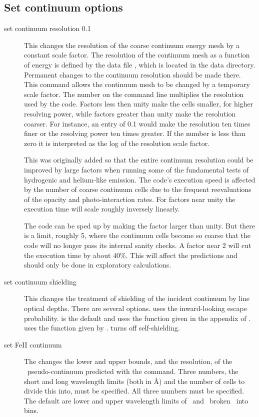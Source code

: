 \subsection{Set continuum options }
\begin{description}
\item[set continuum resolution 0.1]  This changes the resolution of the coarse
continuum energy mesh by a constant scale factor.  The resolution of the
continuum mesh as a function of energy is defined by the data file
, which is located in the data directory.  Permanent
changes to the continuum resolution should be made there.
This command
allows the continuum mesh to be changed by a temporary scale factor.
The
number on the command line multiplies the resolution used by the code.
Factors less then unity make the cells smaller, for higher
resolving power, while factors greater than unity make the resolution coarser.
For instance, an entry of 0.1 would make the resolution ten times finer
or the resolving power ten times greater.
If the number is less than zero
it is interpreted as the log of the resolution scale factor.

This was originally added so that the entire continuum resolution
could be improved by large factors when running some of the
fundamental tests
of hydrogenic and helium-like emission.
The code's execution speed is
affected by the number of coarse continuum cells due to the frequent
reevaluations of the opacity and photo-interaction rates.
For factors near
unity the execution time will scale roughly inversely linearly.

The code can be sped up by making the factor larger than unity.
But
there is a limit, roughly 5, where the continuum cells become so coarse
that the code will no longer pass its internal sanity checks.
A factor
near 2 will cut the execution time by about 40\%.
This will affect the
predictions and should only be done in exploratory calculations.

\item[set continuum shielding]  This changes the treatment
of shielding of the
incident continuum by line optical depths.
There are several options.
 uses the inward-looking escape probability.
 is the default
and uses the function given in the appendix of \citet{Federman1979}.
 uses the function given by \citet{Ferland1992}.   turns off
self-shielding.

\item[set FeII continuum]
\label{sec:CommandSetFeIIContinuum}
The changes the lower and upper bounds, and the resolution,
of the \feii\ pseudo-continuum predicted with the
 command.
Three numbers, the short and long wavelength limits
(both in \AA ) and the number of cells to divide this into,
must be specified.
All three numbers must be specified.
The default are lower and upper wavelength limits of
\FeIIfeconwlLo\ and \FeIIfeconwlHi\
broken \FeIInfecon\ into bins.


\end{description}
